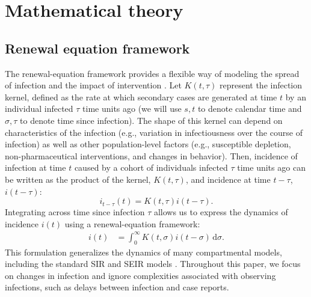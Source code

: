 \documentclass[12pt]{article}
\newcommand{\dd}[1]{\ensuremath{\, \mathrm{d}#1}}
\newcommand{\dsigma}{\dd{\sigma}}
\begin{document}
\section{Mathematical theory}

\subsection{Renewal equation framework}

The renewal-equation framework provides a flexible way of modeling the spread of infection and the impact of intervention \citep{fraser2007estimating}.
Let $K(t, \tau)$ represent the infection kernel, defined as the rate at which secondary cases are generated at time $t$ by an individual infected $\tau$ time units ago (we will use $s, t$ to denote calendar time and $\sigma, \tau$ to denote time since infection).
The shape of this kernel can depend on characteristics of the infection (e.g., variation in infectiousness over the course of infection) as well as other population-level factors (e.g., susceptible depletion, non-pharmaceutical interventions, and changes in behavior).
Then, incidence of infection at time $t$ caused by a cohort of individuals infected $\tau$ time units ago can be written as the product of the kernel, $K(t, \tau)$, and incidence at time $t-\tau$, $i(t-\tau)$:
\begin{equation}
i_{t-\tau}(t) = K(t, \tau) i(t-\tau).
\end{equation}
Integrating across time since infection $\tau$ allows us to express the dynamics of incidence $i(t)$ using a renewal-equation framework: 
\begin{align}
i(t) &= \int_0^\infty K(t, \sigma) i(t-\sigma) \dsigma.
\label{eq:renewal}
\end{align}
This formulation generalizes the dynamics of many compartmental models, including the standard SIR and SEIR models \citep{heesterbeek1996concept, diekmann2000mathematical, roberts2004modelling, aldis2005integral, roberts2007model, champredon2018equivalence}.
Throughout this paper, we focus on changes in infection and ignore complexities associated with observing infections, such as delays between infection and case reports.
\end{document}
